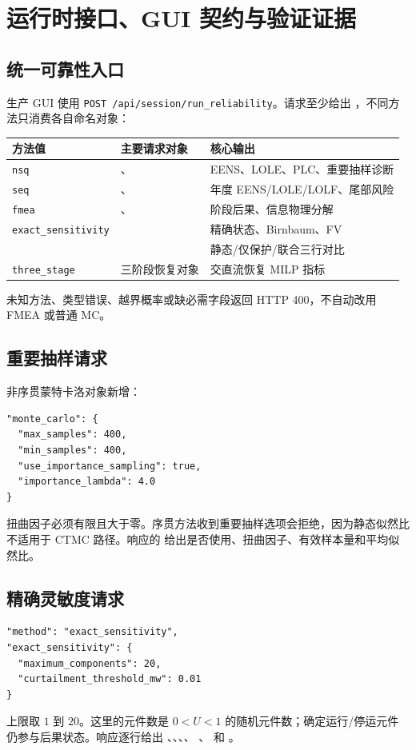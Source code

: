 \section{运行时接口、GUI 契约与验证证据}\label{sec:rel-runtime-contract}

\subsection{统一可靠性入口}
生产 GUI 使用 \texttt{POST /api/session/run\_reliability}。请求至少给出 ，不同方法只消费各自命名对象：
\begin{center}\footnotesize
\begin{tabular}{@{}L{4.0cm}L{5.0cm}L{5.2cm}@{}}
\toprule
方法值 & 主要请求对象 & 核心输出\\
\midrule
\texttt{nsq} & 、 & EENS、LOLE、PLC、重要抽样诊断\\
\texttt{seq} & 、 & 年度 EENS/LOLE/LOLF、尾部风险\\
\texttt{fmea} & 、 & 阶段后果、信息物理分解\\
\texttt{exact\_sensitivity} &  & 精确状态、Birnbaum、FV\\
 &  & 静态/仅保护/联合三行对比\\
\texttt{three\_stage} & 三阶段恢复对象 & 交直流恢复 MILP 指标\\
\bottomrule
\end{tabular}
\end{center}
未知方法、类型错误、越界概率或缺必需字段返回 HTTP 400，不自动改用 FMEA 或普通 MC。

\subsection{重要抽样请求}
非序贯蒙特卡洛对象新增：
\begin{verbatim}
"monte_carlo": {
  "max_samples": 400,
  "min_samples": 400,
  "use_importance_sampling": true,
  "importance_lambda": 4.0
}
\end{verbatim}
扭曲因子必须有限且大于零。序贯方法收到重要抽样选项会拒绝，因为静态似然比不适用于 CTMC 路径。响应的
 给出是否使用、扭曲因子、有效样本量和平均似然比。

\subsection{精确灵敏度请求}
\begin{verbatim}
"method": "exact_sensitivity",
"exact_sensitivity": {
  "maximum_components": 20,
  "curtailment_threshold_mw": 0.01
}
\end{verbatim}
上限取 $1$ 到 $20$。这里的元件数是 $0<U<1$ 的随机元件数；确定运行/停运元件仍参与后果状态。响应逐行给出
、、、、
、 和 。

